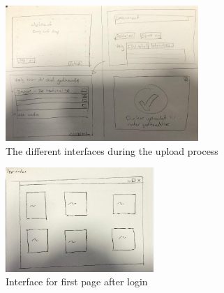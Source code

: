 \begin{figure}[H]
	\centering
		\includegraphics[width=0.65\textwidth]{billeder/Upload-view.jpg}
		\caption{The different interfaces during the upload process}
		\label{fig:1-Upload}
\end{figure}

\begin{figure}[H]
	\centering
	\includegraphics[width=0.5\textwidth]{billeder/app-view.jpg}
	\caption{Interface for first page after login}
	\label{fig:1-app-view}
\end{figure}

